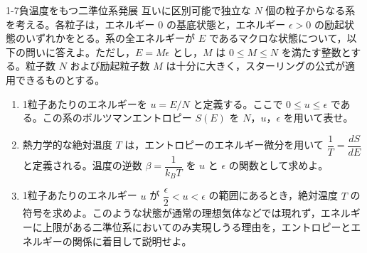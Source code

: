 
\begin{mondai}{1-7}{負温度をもつ二準位系}{発展}
互いに区別可能で独立な $N$ 個の粒子からなる系を考える。各粒子は，エネルギー $0$ の基底状態と，エネルギー $\epsilon > 0$ の励起状態のいずれかをとる。系の全エネルギーが $E$ であるマクロな状態について，以下の問いに答えよ。ただし，$E = M\epsilon$ とし，$M$ は $0 \le M \le N$ を満たす整数とする。粒子数 $N$ および励起粒子数 $M$ は十分に大きく，スターリングの公式が適用できるものとする。

\begin{enumerate}
  \item 1粒子あたりのエネルギーを $u = E/N$ と定義する。ここで $0 \le u \le \epsilon$ である。この系のボルツマンエントロピー $S(E)$ を $N$，$u$，$\epsilon$ を用いて表せ。

  \item 熱力学的な絶対温度 $T$ は，エントロピーのエネルギー微分を用いて $\dfrac{1}{T} = \dfrac{dS}{dE}$ と定義される。温度の逆数 $\beta = \dfrac{1}{k_B T}$ を $u$ と $\epsilon$ の関数として求めよ。

  \item 1粒子あたりのエネルギー $u$ が $\dfrac{\epsilon}{2} < u < \epsilon$ の範囲にあるとき，絶対温度 $T$ の符号を求めよ。このような状態が通常の理想気体などでは現れず，エネルギーに上限がある二準位系においてのみ実現しうる理由を，エントロピーとエネルギーの関係に着目して説明せよ。
\end{enumerate}
\end{mondai}

